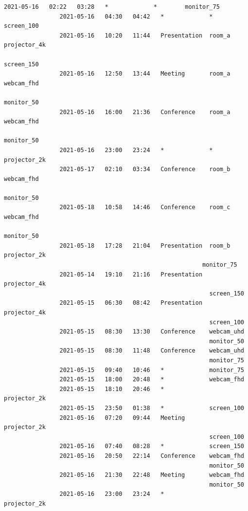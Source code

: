 \documentclass{article}
\begin{document}
\begin{Verbatim}[gobble=8]
                2021-05-16   02:22   03:28   *             *        monitor_75
                2021-05-16   04:30   04:42   *             *        screen_100
                2021-05-16   10:20   11:44   Presentation  room_a   projector_4k
                                                                    screen_150
                2021-05-16   12:50   13:44   Meeting       room_a   webcam_fhd
                                                                    monitor_50
                2021-05-16   16:00   21:36   Conference    room_a   webcam_fhd
                                                                    monitor_50
                2021-05-16   23:00   23:24   *             *        projector_2k
                2021-05-17   02:10   03:34   Conference    room_b   webcam_fhd
                                                                    monitor_50
                2021-05-18   10:58   14:46   Conference    room_c   webcam_fhd
                                                                    monitor_50
                2021-05-18   17:28   21:04   Presentation  room_b   projector_2k
                                                         monitor_75
                2021-05-14   19:10   21:16   Presentation  projector_4k
                                                           screen_150
                2021-05-15   06:30   08:42   Presentation  projector_4k
                                                           screen_100
                2021-05-15   08:30   13:30   Conference    webcam_uhd
                                                           monitor_50
                2021-05-15   08:30   11:48   Conference    webcam_uhd
                                                           monitor_75
                2021-05-15   09:40   10:46   *             monitor_75
                2021-05-15   18:00   20:48   *             webcam_fhd
                2021-05-15   18:10   20:46   *             projector_2k
                2021-05-15   23:50   01:38   *             screen_100
                2021-05-16   07:20   09:44   Meeting       projector_2k
                                                           screen_100
                2021-05-16   07:40   08:28   *             screen_150
                2021-05-16   20:50   22:14   Conference    webcam_fhd
                                                           monitor_50
                2021-05-16   21:30   22:48   Meeting       webcam_fhd
                                                           monitor_50
                2021-05-16   23:00   23:24   *             projector_2k
                

\end{Verbatim}
\end{document}
